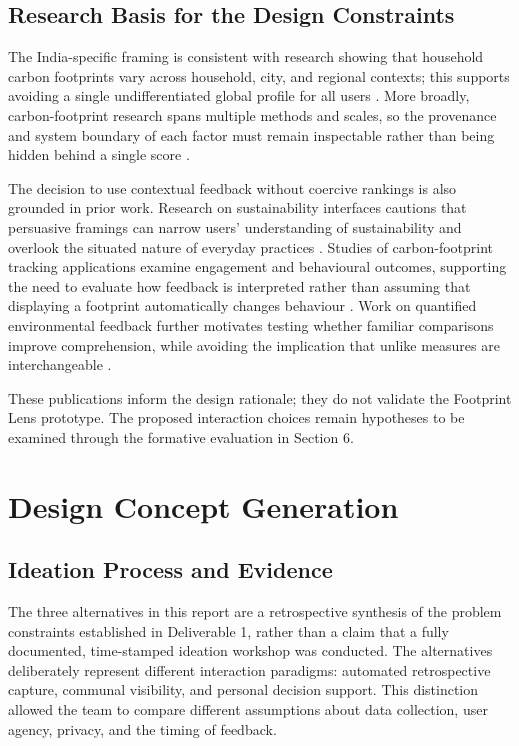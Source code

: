 \documentclass[12pt, a4paper]{article}
\begin{document}
\subsection{Research Basis for the Design Constraints}
The India-specific framing is consistent with research showing that household carbon footprints vary across household, city, and regional contexts; this supports avoiding a single undifferentiated global profile for all users \cite{lee2021}. More broadly, carbon-footprint research spans multiple methods and scales, so the provenance and system boundary of each factor must remain inspectable rather than being hidden behind a single score \cite{shi2021}.

The decision to use contextual feedback without coercive rankings is also grounded in prior work. Research on sustainability interfaces cautions that persuasive framings can narrow users' understanding of sustainability and overlook the situated nature of everyday practices \cite{brynjarsdottir2012}. Studies of carbon-footprint tracking applications examine engagement and behavioural outcomes, supporting the need to evaluate how feedback is interpreted rather than assuming that displaying a footprint automatically changes behaviour \cite{hoffmann2024,lasarov2024}. Work on quantified environmental feedback further motivates testing whether familiar comparisons improve comprehension, while avoiding the implication that unlike measures are interchangeable \cite{mohanty2023}.

These publications inform the design rationale; they do not validate the Footprint Lens prototype. The proposed interaction choices remain hypotheses to be examined through the formative evaluation in Section 6.

\section{Design Concept Generation}

\subsection{Ideation Process and Evidence}
The three alternatives in this report are a retrospective synthesis of the problem constraints established in Deliverable 1, rather than a claim that a fully documented, time-stamped ideation workshop was conducted. The alternatives deliberately represent different interaction paradigms: automated retrospective capture, communal visibility, and personal decision support. This distinction allowed the team to compare different assumptions about data collection, user agency, privacy, and the timing of feedback.
\end{document}
